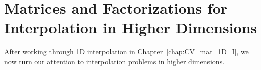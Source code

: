 \chapter{\CV{} Matrices and Factorizations for Interpolation
in Higher Dimensions}
\label{chap:CV_mat_HD_I}

After working through 1D interpolation in Chapter~\ref{chap:CV_mat_1D_I},
we now turn our attention to interpolation problems in higher dimensions.
